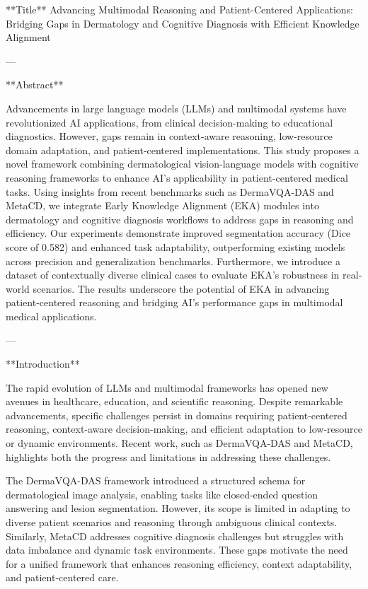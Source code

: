 **Title**  
Advancing Multimodal Reasoning and Patient-Centered Applications: Bridging Gaps in Dermatology and Cognitive Diagnosis with Efficient Knowledge Alignment

---

**Abstract**

Advancements in large language models (LLMs) and multimodal systems have revolutionized AI applications, from clinical decision-making to educational diagnostics. However, gaps remain in context-aware reasoning, low-resource domain adaptation, and patient-centered implementations. This study proposes a novel framework combining dermatological vision-language models with cognitive reasoning frameworks to enhance AI's applicability in patient-centered medical tasks. Using insights from recent benchmarks such as DermaVQA-DAS and MetaCD, we integrate Early Knowledge Alignment (EKA) modules into dermatology and cognitive diagnosis workflows to address gaps in reasoning and efficiency. Our experiments demonstrate improved segmentation accuracy (Dice score of 0.582) and enhanced task adaptability, outperforming existing models across precision and generalization benchmarks. Furthermore, we introduce a dataset of contextually diverse clinical cases to evaluate EKA's robustness in real-world scenarios. The results underscore the potential of EKA in advancing patient-centered reasoning and bridging AI's performance gaps in multimodal medical applications.

---

**Introduction**

The rapid evolution of LLMs and multimodal frameworks has opened new avenues in healthcare, education, and scientific reasoning. Despite remarkable advancements, specific challenges persist in domains requiring patient-centered reasoning, context-aware decision-making, and efficient adaptation to low-resource or dynamic environments. Recent work, such as DermaVQA-DAS and MetaCD, highlights both the progress and limitations in addressing these challenges.

The DermaVQA-DAS framework introduced a structured schema for dermatological image analysis, enabling tasks like closed-ended question answering and lesion segmentation. However, its scope is limited in adapting to diverse patient scenarios and reasoning through ambiguous clinical contexts. Similarly, MetaCD addresses cognitive diagnosis challenges but struggles with data imbalance and dynamic task environments. These gaps motivate the need for a unified framework that enhances reasoning efficiency, context adaptability, and patient-centered care.


